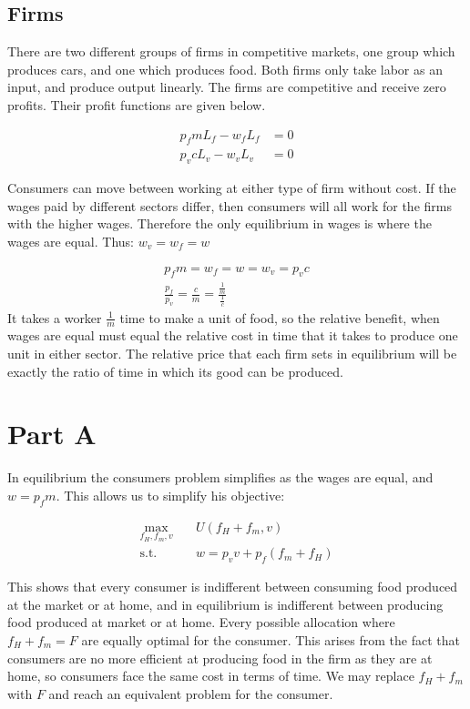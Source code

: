 \documentclass[12pt]{paper}
\begin{document}
\subsection*{Firms}

There are two different groups of firms in competitive markets, one
group which produces cars, and one which produces food. Both firms
only take labor as an input, and produce output linearly. The firms
are competitive and receive zero profits. Their profit functions are
given below.

\begin{align*}
  p_f m L_f - w_f L_f &= 0\\
  p_v c L_v - w_v L_v &= 0
\end{align*}

Consumers can move between working at either type of firm without
cost. If the wages paid by different sectors differ, then consumers
will all work for the firms with the higher wages. Therefore the only
equilibrium in wages is where the wages are equal. Thus: $w_v = w_f = w$

\begin{align*}
  p_f m = w_f = w = w_v = p_v c\\
  \frac{p_f}{p_v} = \frac{c}{m} = \frac{\frac{1}{m}}{\frac{1}{c}}
\end{align*}
It takes a worker $\frac{1}{m}$ time to make a unit of food, so the
relative benefit, when wages are equal must equal the relative cost in
time that it takes to produce one unit in either sector. The relative price
that each firm sets in equilibrium will be exactly the ratio of time
in which its good can be produced. 

\section*{Part A}

In equilibrium the consumers problem simplifies as the wages are
equal, and $w = p_f m$. This allows us to simplify his objective:

\begin{align*}
  \max_{f_H, f_m,v} \quad &U( f_H + f_m, v)\\
  \text{s.t.} \quad& w = p_v v + p_f ( f_m + f_H)
\end{align*}

This shows that every consumer is indifferent between consuming food
produced at the market or at home, and in equilibrium is indifferent
between producing food produced at market or at home. Every possible
allocation where $f_H + f_m = F$ are equally optimal for the
consumer. This arises from the fact that consumers are no more
efficient at producing food in the firm as they are at home, so
consumers face the same cost in terms of time. We may replace $f_H +
f_m$ with $F$ and reach an equivalent problem for the consumer.
\end{document}
